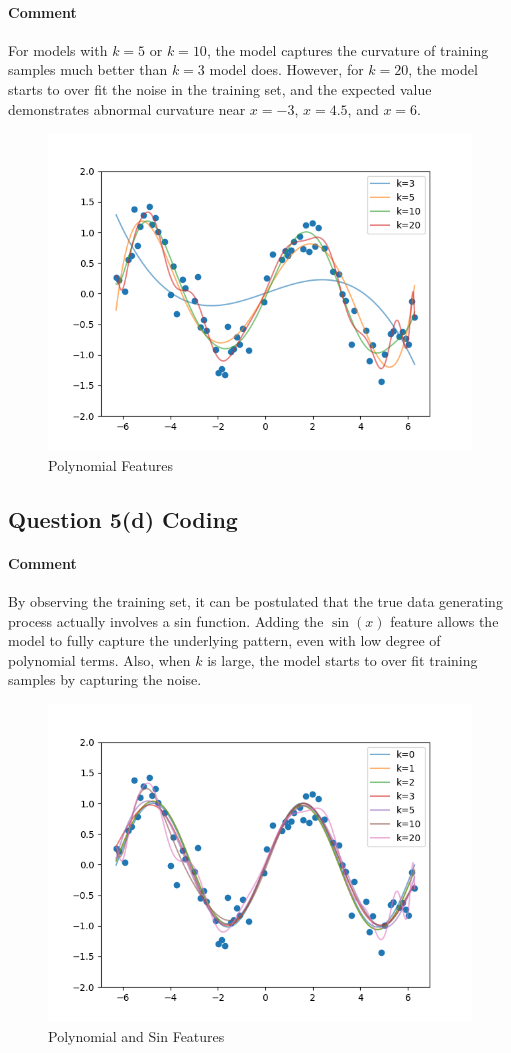 \documentclass[11pt]{article}
\begin{document}
	\paragraph{Comment} For models with $k=5$ or $k=10$, the model captures the curvature of training samples much better than $k=3$ model does. However, for $k=20$, the model starts to over fit the noise in the training set, and the expected value demonstrates abnormal curvature near $x=-3$, $x=4.5$, and $x=6$.
	\begin{figure}[h]
		\centering
		\includegraphics[width=0.6\linewidth]{src/featuremaps/5c.png}
		\caption{Polynomial Features}
	\end{figure}
	
	\subsection{Question 5(d) Coding}
	\paragraph{Comment} By observing the training set, it can be postulated that the true data generating process actually involves a sin function. Adding the $\sin(x)$ feature allows the model to fully capture the underlying pattern, even with low degree of polynomial terms. Also, when $k$ is large, the model starts to over fit training samples by capturing the noise.
	\begin{figure}[h]
		\centering
		\includegraphics[width=0.6\linewidth]{src/featuremaps/5d.png}
		\caption{Polynomial and Sin Features}
	\end{figure}
	
\end{document}
